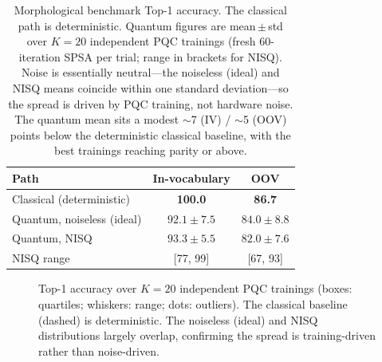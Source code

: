 \documentclass[journal]{IEEEtran}
\begin{document}
\begin{table}[t]
\centering
\caption{Morphological benchmark Top-1 accuracy. The classical path is
deterministic. Quantum figures are mean\,$\pm$\,std over $K{=}20$ independent
PQC trainings (fresh 60-iteration SPSA per trial; range in brackets for NISQ).
Noise is essentially neutral---the noiseless (ideal) and NISQ means coincide
within one standard deviation---so the spread is driven by PQC training, not
hardware noise. The quantum mean sits a modest $\sim$7 (IV) / $\sim$5 (OOV)
points below the deterministic classical baseline, with the best trainings
reaching parity or above.}
\label{tab:morphacc}
\small
\begin{tabular}{@{}lcc@{}}
\toprule
Path & In-vocabulary & OOV \\
\midrule
Classical (deterministic)        & \textbf{100.0} & \textbf{86.7} \\
Quantum, noiseless (ideal)       & $92.1\pm7.5$   & $84.0\pm8.8$ \\
Quantum, NISQ                    & $93.3\pm5.5$   & $82.0\pm7.6$ \\
\quad NISQ range                 & [77, 99]       & [67, 93] \\
\bottomrule
\end{tabular}
\end{table}

\begin{figure}[t]
\centering
{}
\caption{Top-1 accuracy over $K{=}20$ independent PQC trainings (boxes: quartiles;
whiskers: range; dots: outliers). The classical baseline (dashed) is
deterministic. The noiseless (ideal) and NISQ distributions largely overlap,
confirming the spread is training-driven rather than noise-driven.}
\label{fig:accuracy}
\end{figure}
\end{document}

